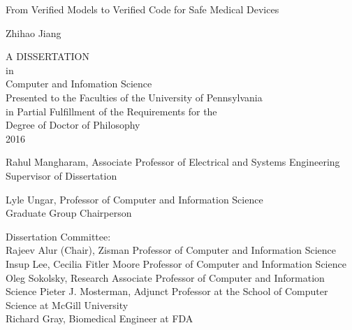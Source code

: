 \documentclass[12pt,letterpaper]{report}
\theoremstyle{definition}
\theoremstyle{remark}
\numberwithin{equation}{chapter}
\theoremstyle{plain} %
\def\thetitle{From Verified Models to Verified Code for Safe Medical Devices}
\def\theauthor{Zhihao Jiang}
\def\theyear{2016}
\begin{document}

\newpage
{}
{}
\thispagestyle{empty}
\vspace*{\fill}
\begin{center}
\thetitle

\vspace*{0.3in}
\theauthor

\vspace*{0.3in}
A DISSERTATION\\
$ $\\
in \\
$ $\\
Computer and Infomation Science\\
$ $\\
Presented to the Faculties of the University of Pennsylvania\\
in Partial Fulfillment of the Requirements for the\\
Degree of Doctor of Philosophy\\
$ $\\
\theyear
\end{center}

\vspace{0.6 in}
\noindent\makebox[0in][l]{\rule[2ex]{3in}{.3mm}}
Rahul Mangharam, Associate Professor of Electrical and Systems Engineering\\Supervisor of Dissertation

\vspace*{0.6 in}
\noindent\makebox[0in][l]{\rule[2ex]{3in}{.3mm}}
Lyle Ungar, Professor of Computer and Information Science\\Graduate Group Chairperson

\vspace*{0.2in}
\noindent Dissertation Committee:\\
Rajeev Alur (Chair), Zisman Professor of Computer and Information Science\\
Insup Lee, Cecilia Fitler Moore Professor of Computer and Information Science\\
Oleg Sokolsky, Research Associate Professor of Computer and Information Science
Pieter J. Mosterman, Adjunct Professor at the School of Computer Science at McGill University\\
Richard Gray, Biomedical Engineer at FDA
\vspace*{\fill}
\end{document}
